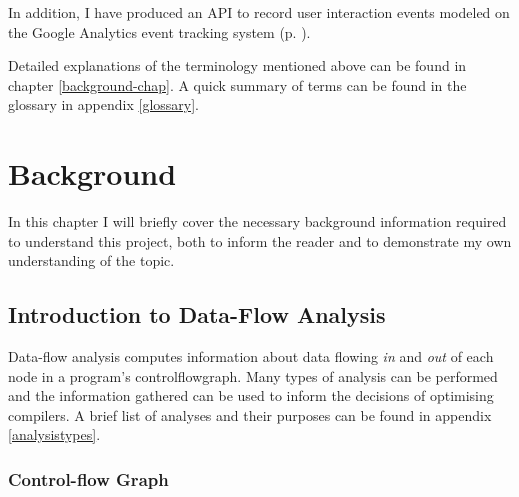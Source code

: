 \documentclass[bsc,twoside,singlespacing,parskip,logo,notimes,normalheadings]{infthesis}
\begin{document}
    In addition, I have produced an API to record user interaction
    events modeled on the Google Analytics event tracking system
    (p. ). %

    Detailed explanations of the terminology mentioned above can be
    found in chapter \ref{background-chap}. A quick summary of terms
    can be found in the glossary in appendix \ref{glossary}.


\chapter{Background}
In this chapter I will briefly cover the necessary background
information required to understand this project, both to inform the
reader and to demonstrate my own understanding of the topic.

    \section{Introduction to Data-Flow Analysis}
    Data-flow analysis computes information about data flowing {\em
      in} and {\em out} of each node in a program's
    \gls{controlflowgraph}. Many types of analysis can be performed
    and the information gathered can be used to inform the decisions
    of optimising compilers. A brief list of analyses and their
    purposes can be found in appendix \ref{analysistypes}.
    
        \subsection{Control-flow Graph}
\end{document}
